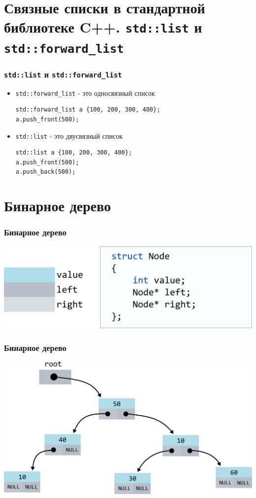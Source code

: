 \documentclass[10pt,pdf,hyperref={unicode}]{beamer}
\begin{document}
\section{Связные списки в стандартной библиотеке C++. \texttt{std::list} и \texttt{std::forward\_list}}

\begin{frame}[fragile]
\frametitle{\texttt{std::list} и \texttt{std::forward\_list}}
\begin{itemize}
\item \texttt{std::forward\_list} - это односвязный список
\begin{lstlisting}
std::forward_list a {100, 200, 300, 400};
a.push_front(500);
\end{lstlisting}

\item \texttt{std::list} - это двусвязный список
\begin{lstlisting}
std::list a {100, 200, 300, 400};
a.push_front(500);
a.push_back(500);
\end{lstlisting}
\end{itemize}
\end{frame}


\section{Бинарное дерево}

\begin{frame}[fragile]
\frametitle{Бинарное дерево}
\begin{center}
\includegraphics[scale=0.8]{images/tree/structtree.png}
\end{center}
\end{frame}


\begin{frame}[fragile]
\frametitle{Бинарное дерево}
\begin{center}
\includegraphics[scale=0.6]{images/tree/bt.png}
\end{center}
\end{frame}
\end{document}
